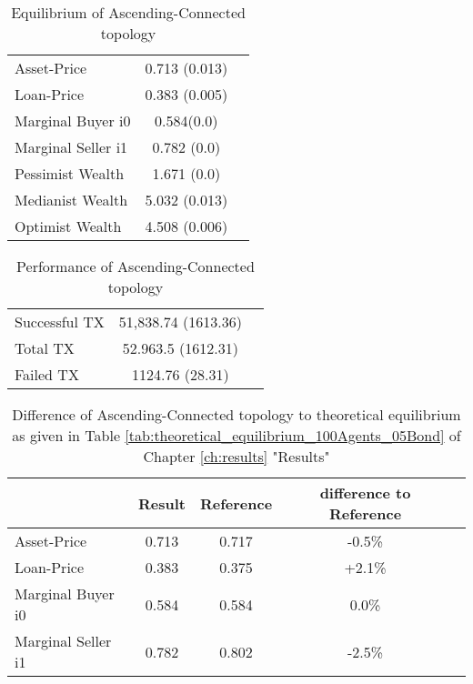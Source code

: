 \documentclass[Bachelorarbeit.tex]{subfiles}
\begin{document}
\begin{table}[H]
	\caption{Equilibrium of Ascending-Connected topology}
	\centering
	\begin{tabular} { l c r }
		\hline
		Asset-Price & 0.713 (0.013) \\
		Loan-Price & 0.383 (0.005) \\
		Marginal Buyer i0 & 0.584(0.0) \\
		Marginal Seller i1 & 0.782 (0.0) \\
		\hline
		Pessimist Wealth & 1.671 (0.0) \\
		Medianist Wealth & 5.032 (0.013) \\
		Optimist Wealth & 4.508 (0.006) \\
		\hline
	\end{tabular}
\end{table} 

\begin{table}[H]
	\caption{Performance of Ascending-Connected topology}
	\centering
	\begin{tabular} { l c r }
		\hline
		Successful TX & 51,838.74 (1613.36) \\
		Total TX & 52.963.5 (1612.31) \\
		Failed TX & 1124.76 (28.31) \\
		\hline
	\end{tabular}
\end{table}

\begin{table}[H]
	\caption{Difference of Ascending-Connected topology to theoretical equilibrium as given in Table \ref{tab:theoretical_equilibrium_100Agents_05Bond} of Chapter \ref{ch:results} "Results"}
	\centering
	\begin{tabular} { l c c c r }
		& Result & Reference & difference to Reference \\
		\hline
		Asset-Price & 0.713 & 0.717 & -0.5\% \\
		Loan-Price & 0.383 & 0.375 & +2.1\% \\
		Marginal Buyer i0 & 0.584 & 0.584 & 0.0\% \\
		Marginal Seller i1 & 0.782 & 0.802 & -2.5\% \\
		\hline
	\end{tabular}
\end{table} 
\end{document}
